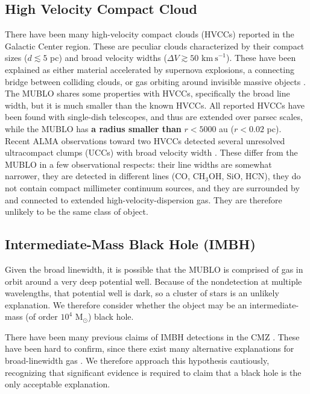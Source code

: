 \documentclass[]{aastex631}
\newcommand{\msun}{\ensuremath{\mathrm{M}_\odot}\xspace}
\newcommand{\kms}{\ensuremath{\mathrm{km~s}^{-1}}\xspace}
\def\rr#1{\textbf{#1}}
\begin{document}
\subsection{High Velocity Compact Cloud}

There have been many high-velocity compact clouds (HVCCs) reported in the Galactic Center region.  These are peculiar clouds characterized by their compact sizes ($d\lesssim 5$ pc) and broad velocity widths ($\Delta V\gtrsim 50$ \kms).  These have been explained as either material accelerated by supernova explosions, a connecting bridge between colliding clouds, or gas orbiting around invisible massive objects \citep{Oka2014,Oka2016,Oka2022,Iwata2023}.  The MUBLO shares some properties with HVCCs, specifically the broad line width, but it is much smaller than the known HVCCs.  All reported HVCCs have been found with single-dish telescopes, and thus are extended over parsec scales, while the MUBLO has \rr{a radius smaller than} $r<5000$ au ($r<0.02$ pc).  Recent ALMA observations toward two HVCCs  detected several unresolved ultracompact clumps (UCCs) with broad velocity width  \citep[$\Delta V\sim 50$ \kms;][]{Takekawa2019,Iwata2023}.
These differ from the MUBLO in a few observational respects: their line widths are somewhat narrower, they are detected in different lines (CO, CH$_3$OH, SiO, HCN), they do not contain compact millimeter continuum sources, and they are surrounded by and connected to extended high-velocity-dispersion gas.
They are therefore unlikely to be the same class of object.


\subsection{Intermediate-Mass Black Hole (IMBH)}
\label{sec:imbh}
Given the broad linewidth, it is possible that the MUBLO is comprised of gas in orbit around a very deep potential well.
Because of the nondetection at multiple wavelengths, that potential well is dark, so a cluster of stars is an unlikely explanation.
We therefore consider whether the object may be an intermediate-mass (of order $10^4$ \msun) black hole.

There have been many previous claims of IMBH detections in the CMZ \citep{Oka2016,Tsuboi2017,Takekawa2019,Takekawa2020}.
These have been hard to confirm, since there exist many alternative explanations for broad-linewidth gas \citep{Ballone2018,Oka2017,Ravi2018,Tanaka2018}.
We therefore approach this hypothesis cautiously, recognizing that significant evidence is required to claim that a black hole is the only acceptable explanation.
\end{document}
